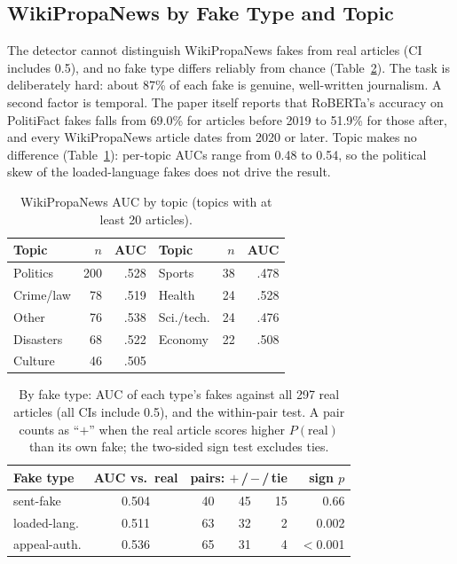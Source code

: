 \documentclass[11pt]{article}
\begin{document}
\subsection{WikiPropaNews by Fake Type and Topic}

The detector cannot distinguish WikiPropaNews fakes from real articles (CI includes 0.5), and no fake type differs reliably from chance (Table~\ref{tab:paired}). The task is deliberately hard: about 87\% of each fake is genuine, well-written journalism. A second factor is temporal. The paper itself reports that RoBERTa's accuracy on PolitiFact fakes falls from 69.0\% for articles before 2019 to 51.9\% for those after, and every WikiPropaNews article dates from 2020 or later. Topic makes no difference (Table~\ref{tab:topic}): per-topic AUCs range from 0.48 to 0.54, so the political skew of the loaded-language fakes does not drive the result.

\begin{table}[t]
\centering\small
\setlength{\tabcolsep}{4pt}
\begin{tabular}{lrr|lrr}
\toprule
Topic & $n$ & AUC & Topic & $n$ & AUC \\
\midrule
Politics & 200 & .528 & Sports & 38 & .478 \\
Crime/law & 78 & .519 & Health & 24 & .528 \\
Other & 76 & .538 & Sci./tech. & 24 & .476 \\
Disasters & 68 & .522 & Economy & 22 & .508 \\
Culture & 46 & .505 & & & \\
\bottomrule
\end{tabular}
\caption{WikiPropaNews AUC by topic (topics with at least 20 articles).}
\label{tab:topic}
\end{table}

\begin{table}[t]
\centering\small
\setlength{\tabcolsep}{3pt}
\begin{tabular}{lcrrrr}
\toprule
Fake type & AUC vs.\ real & \multicolumn{3}{c}{pairs: $+$\,/\,$-$\,/\,tie} & sign $p$ \\
\midrule
sent-fake & 0.504 & 40 & 45 & 15 & 0.66 \\
loaded-lang. & 0.511 & 63 & 32 & 2 & 0.002 \\
appeal-auth. & 0.536 & 65 & 31 & 4 & $<$0.001 \\
\bottomrule
\end{tabular}
\caption{By fake type: AUC of each type's fakes against all 297 real articles (all CIs include 0.5), and the within-pair test. A pair counts as ``$+$'' when the real article scores higher $P(\text{real})$ than its own fake; the two-sided sign test excludes ties.}
\label{tab:paired}
\end{table}
\end{document}
